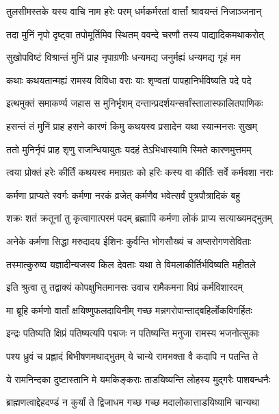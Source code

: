 \twolineshloka
{तुलसीमस्तके यस्य वाचि नाम हरेः परम्}
{धर्मकर्मरतां वार्त्तां श्रावयन्तं निजाञ्जनान्}%

\twolineshloka
{तदा मुनिं नृपो दृष्ट्वा तपोमूर्तिमिव स्थितम्}
{ववन्दे चरणौ तस्य पाद्यादिकमथाकरोत्}%

\twolineshloka
{सुखोपविष्टं विश्रान्तं मुनिं प्राह नृपाग्रणीः}
{धन्यमद्य जनुर्मह्यं धन्यमद्य गृहं मम}%

\twolineshloka
{कथाः कथयतान्मह्यं रामस्य विविधा वराः}
{याः शृण्वतां पापहानिर्भविष्यति पदे पदे}%

\twolineshloka
{इत्थमुक्तं समाकर्ण्य जहास स मुनिर्भृशम्}
{दन्तान्प्रदर्शयन्सर्वांस्तालास्फालितपाणिकः}%

\twolineshloka
{हसन्तं तं मुनिं प्राह हसने कारणं किमु}
{कथयस्व प्रसादेन यथा स्यान्मनसः सुखम्}%

\twolineshloka
{ततो मुनिर्नृपं प्राह शृणु राजन्धियायुतः}
{यदहं तेऽभिधास्यामि स्मिते कारणमुत्तमम्}%

\twolineshloka
{त्वया प्रोक्तं हरेः कीर्तिं कथयस्व ममाग्रतः}
{को हरिः कस्य वा कीर्तिः सर्वे कर्मवशा नराः}%

\twolineshloka
{कर्मणा प्राप्यते स्वर्गः कर्मणा नरकं व्रजेत्}
{कर्मणैव भवेत्सर्वं पुत्रपौत्रादिकं बहु}%

\twolineshloka
{शक्रः शतं क्रतूनां तु कृत्वागात्परमं पदम्}
{ब्रह्मापि कर्मणा लोकं प्राप्य सत्याख्यमद्भुतम्}%

\twolineshloka
{अनेके कर्मणा सिद्धा मरुदादय ईशिनः}
{कुर्वन्ति भोगसौख्यं च अप्सरोगणसेविताः}%

\twolineshloka
{तस्मात्कुरुष्व यज्ञादीन्यजस्व किल देवताः}
{यथा ते विमलाकीर्तिर्भविष्यति महीतले}%

\twolineshloka
{इति श्रुत्वा तु तद्वाक्यं कोपक्षुभितमानसः}
{उवाच रामैकमना विप्रं कर्मविशारदम्}%

\twolineshloka
{मा ब्रूहि कर्मणो वार्तां क्षयिष्णुफलदायिनीम्}
{गच्छ मन्नगरोपान्ताद्बहिर्लोकविगर्हितः}%

\twolineshloka
{इन्द्रः पतिष्यति क्षिप्रं पतिष्यत्यपि पद्मजः}
{न पतिष्यन्ति मनुजा रामस्य भजनोत्सुकाः}%

\twolineshloka
{पश्य ध्रुवं च प्रह्लादं बिभीषणमथाद्भुतम्}
{ये चान्ये रामभक्ता वै कदापि न पतन्ति ते}%

\twolineshloka
{ये रामनिन्दका दुष्टास्तानि मे यमकिङ्कराः}
{ताडयिष्यन्ति लोहस्य मुद्गरैः पाशबन्धनैः}%

\twolineshloka
{ब्राह्मणत्वाद्देहदण्डं न कुर्यां ते द्विजाधम}
{गच्छ गच्छ मदालोकात्ताडयिष्यामि चान्यथा}%

